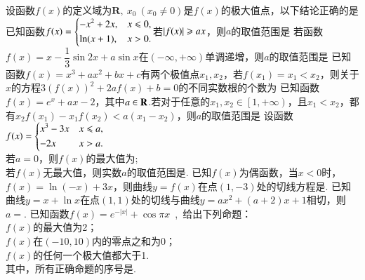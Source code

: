 \documentclass{BHCexam}
\begin{document}
\begin{questions}
\qs 设函数$f(x)$的定义域为$ \mathbf{R} ,~x_0~(x_0\ne 0)$是$f(x)$的极大值点，以下结论正确的是\xx
{}
\question
已知函数$f(x)=\begin{dcases}
-x^2+2x,&x\le0,\\
\ln(x+1),&x>0.
\end{dcases}$若$\abs{f(x)}\ge ax$，则$a$的取值范围是\xx
\onech{$\left(-\infty,0\right]$}{$\left(-\infty,1\right]$}{$\left[-2,-1\right]$}{$\left[-2,0\right]$}
\question
若函数$f(x)=x-\dfrac{1}{3}\sin 2x+a\sin x$在$(-\infty,+\infty)$单调递增，则$a$的取值范围是\xx
{}
\qs 已知函数$f(x)=x^3+ax^2+bx+c$有两个极值点$x_1,x_2$，若$f(x_1)=x_1<x_2$，则关于$x$的方程$3(f(x))^2+2af(x)+b=0$的不同实数根的个数为\xx
{}
\qs 已知函数$f(x)=e^x+ax-2$，其中$ a\inR $.若对于任意的$ x_1,x_2\in\left[1,+\infty\right) $，且$ x_1<x_2 $，都有$ x_2f(x_1)-x_1f(x_2)<a(x_1-x_2) $，则$ a $的取值范围是\xx
{}
\question
设函数
$f(x)=\begin{dcases}
x^3-3x &x\le a,\\
-2x &x>a.
\end{dcases}$\\
若$a=0$，则$f(x)$的最大值为\tk;\\
若$f(x)$无最大值，则实数$a$的取值范围是\tk.
\question
已知$f(x)$为偶函数，当$x<0$时，$f(x)=\ln \left(-x\right)+3x$，则曲线$y=f(x)$在点$(1,-3)$处的切线方程是\tk.
\qs 已知曲线$y=x+\ln x$在点$(1,1)$处的切线与曲线$y=ax^2+(a+2)x+1$相切，则$a=$\tk.
\qs 已知函数$ f(x) =e^{-\left|x\right|}+\cos \pi x$~,~给出下列命题：\\
 $f(x)$的最大值为2；\\
 $f(x)$在$ (-10,10) $内的零点之和为0；\\
 $f(x)$的任何一个极大值都大于1.\\
其中，所有正确命题的序号是\tk.
\end{questions}
\end{document}
